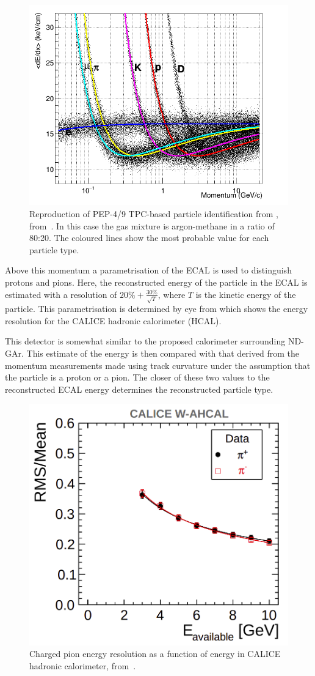 \begin{figure}[h]
	\centering
	\includegraphics[width=.6\linewidth]{files/figures/dune_ndrwt/pep4_dedx_reproduction}
	\caption[PEP-4/9 TPC-based particle identification from \dedx]{Reproduction of PEP-4/9 TPC-based particle identification from \dedx, from~\cite{pep4}. In this case the gas mixture is argon-methane in a ratio of 80:20. The coloured lines show the most probable value for each particle type.}
	\label{fig:pep4dedx}
\end{figure}

Above this momentum a parametrisation of the ECAL is used to distinguish protons and pions.
Here, the reconstructed energy of the particle in the ECAL is estimated with a resolution of 
$20\% + \frac{30\%}{\sqrt{T}}$, where $T$ is the kinetic energy of the particle.
This parametrisation is determined by eye from  which shows the energy resolution for the CALICE hadronic calorimeter (HCAL).

This detector is somewhat similar to the proposed calorimeter surrounding ND-GAr.
This estimate of the energy is then compared with that derived from the momentum measurements made using track curvature under the assumption that the particle is a proton or a pion.
The closer of these two values to the reconstructed ECAL energy determines the reconstructed particle type.

\begin{figure}[h]
	\centering
	\includegraphics[width=.5\linewidth]{files/figures/dune_ndrwt/caliceParam}
	\caption[Charged pion energy resolution as a function of energy in the CALICE HCAL]{Charged pion energy resolution as a function of energy in CALICE hadronic calorimeter, from~\cite{hcalParam}.}
	\label{fig:caliceParam}
\end{figure}

